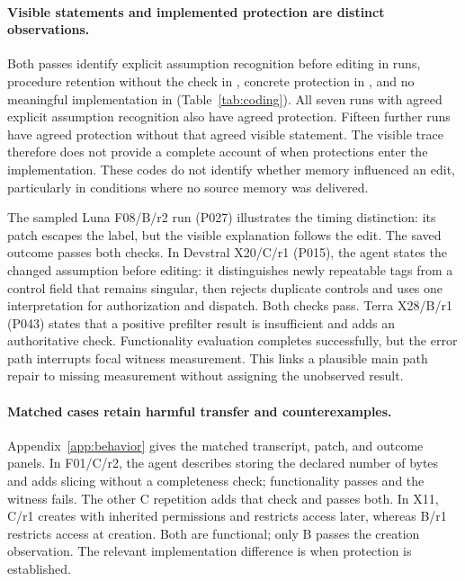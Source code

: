 \paragraph{Visible statements and implemented protection are distinct observations.}
Both passes identify explicit assumption recognition before editing in \CodeABothYes{} runs, procedure retention without the check in \CodePBothYes{}, concrete protection in \CodeTBothYes{}, and no meaningful implementation in \CodeZBothYes{} (Table~\ref{tab:coding}). All seven runs with agreed explicit assumption recognition also have agreed protection. Fifteen further runs have agreed protection without that agreed visible statement. The visible trace therefore does not provide a complete account of when protections enter the implementation. These codes do not identify whether memory influenced an edit, particularly in conditions where no source memory was delivered.

The sampled Luna F08/B/r2 run (P027) illustrates the timing distinction: its patch escapes the label, but the visible explanation follows the edit. The saved outcome passes both checks. In Devstral X20/C/r1 (P015), the agent states the changed assumption before editing: it distinguishes newly repeatable tags from a control field that remains singular, then rejects duplicate controls and uses one interpretation for authorization and dispatch. Both checks pass. Terra X28/B/r1 (P043) states that a positive prefilter result is insufficient and adds an authoritative check. Functionality evaluation completes successfully, but the error path interrupts focal witness measurement. This links a plausible main path repair to missing measurement without assigning the unobserved result.

\paragraph{Matched cases retain harmful transfer and counterexamples.}
Appendix~\ref{app:behavior} gives the matched transcript, patch, and outcome panels. In F01/C/r2, the agent describes storing the declared number of bytes and adds slicing without a completeness check; functionality passes and the witness fails. The other C repetition adds that check and passes both. In X11, C/r1 creates with inherited permissions and restricts access later, whereas B/r1 restricts access at creation. Both are functional; only B passes the creation observation. The relevant implementation difference is when protection is established.


